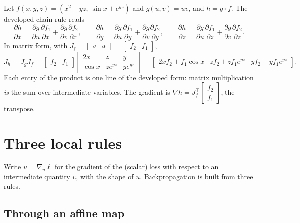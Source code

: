 \begin{notechapter}
\begin{example}\label{backpropagation:ex:chain}
Let $f(x,y,z) = (x^2 + yz,\ \sin x + e^{yz})$ and $g(u,v) = uv$, and $h = g\circ f$. The developed chain rule reads
\[
  \frac{\partial h}{\partial x} = \frac{\partial g}{\partial u}\frac{\partial f_1}{\partial x} + \frac{\partial g}{\partial v}\frac{\partial f_2}{\partial x},\qquad
  \frac{\partial h}{\partial y} = \frac{\partial g}{\partial u}\frac{\partial f_1}{\partial y} + \frac{\partial g}{\partial v}\frac{\partial f_2}{\partial y},\qquad
  \frac{\partial h}{\partial z} = \frac{\partial g}{\partial u}\frac{\partial f_1}{\partial z} + \frac{\partial g}{\partial v}\frac{\partial f_2}{\partial z} .
\]
In matrix form, with $J_g = \begin{bmatrix}v & u\end{bmatrix} = \begin{bmatrix}f_2 & f_1\end{bmatrix}$,
\[
  J_h = J_gJ_f = \begin{bmatrix} f_2 & f_1\end{bmatrix}
  \begin{bmatrix} 2x & z & y\\ \cos x & ze^{yz} & ye^{yz}\end{bmatrix}
  = \begin{bmatrix} 2xf_2 + f_1\cos x & zf_2 + zf_1e^{yz} & yf_2 + yf_1e^{yz}\end{bmatrix} .
\]
Each entry of the product is one line of the developed form: matrix multiplication \emph{is}
the sum over intermediate variables. The gradient is $\nabla h = J_f^\top\begin{bmatrix}f_2\\f_1\end{bmatrix}$, the
transpose.
\end{example}

\section{Three local rules}\label{backpropagation:sec:local}

Write $\bar u = \nabla_u\ell$ for the gradient of the (scalar) loss with respect to an intermediate quantity
$u$, with the shape of $u$. Backpropagation is built from three rules.

\subsection{Through an affine map}\label{backpropagation:sec:affine}


\end{notechapter}
